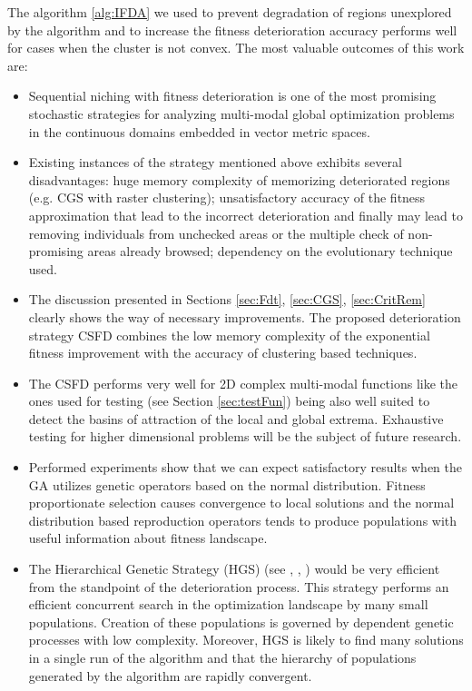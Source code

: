 The algorithm \ref{alg:IFDA} we used to prevent degradation of
regions unexplored by the algorithm and to increase the fitness deterioration accuracy
performs well for cases when the cluster is not convex.
The most valuable outcomes of this work are:
\begin{itemize}

\item
Sequential niching with fitness deterioration is one of the 
most promising stochastic strategies
for analyzing multi-modal global optimization problems in the continuous
domains embedded in vector metric spaces.

\item
Existing instances of the strategy mentioned above
exhibits several disadvantages: 
huge memory complexity of memorizing deteriorated regions
(e.g. CGS with raster clustering); 
unsatisfactory accuracy of the fitness approximation 
that lead to the incorrect deterioration and finally may lead to removing
individuals from unchecked areas or the multiple check of non-promising areas
already browsed; 
dependency on the evolutionary technique used.

\item
The discussion presented in Sections \ref{sec:Fdt}, \ref{sec:CGS}, \ref{sec:CritRem}
clearly shows the way of necessary improvements.
The proposed deterioration strategy CSFD combines the low memory complexity
of the exponential fitness improvement with the accuracy of
clustering based techniques.

\item
The CSFD performs very well for 2D complex multi-modal functions like the ones
used for testing (see Section \ref{sec:testFun}) being also well suited to detect
the basins of attraction of the local and global extrema.
Exhaustive testing for higher dimensional problems will be the subject
of future research.

\item
Performed experiments show that we can expect satisfactory results 
when the GA utilizes
genetic operators based on the normal distribution. 
Fitness proportionate selection causes convergence to local solutions 
and the normal distribution based reproduction operators tends 
to produce populations with useful information about fitness landscape.

\item
The Hierarchical Genetic Strategy (HGS)
(see \cite{SchaeferKolodziej2003},
\cite{SchaeferAdamskaTelega2004},
\citep{WierzbaSemczukKolodziejSchaefer2003})
would be very efficient 
from the standpoint of the deterioration process.
This strategy performs an efficient concurrent
search in the optimization landscape by many small populations. Creation of
these populations is governed by dependent genetic processes with low complexity.
Moreover, HGS is likely to find many solutions in a
single run of the algorithm and that the hierarchy of populations generated
by the algorithm are rapidly convergent. 



\end{itemize}
